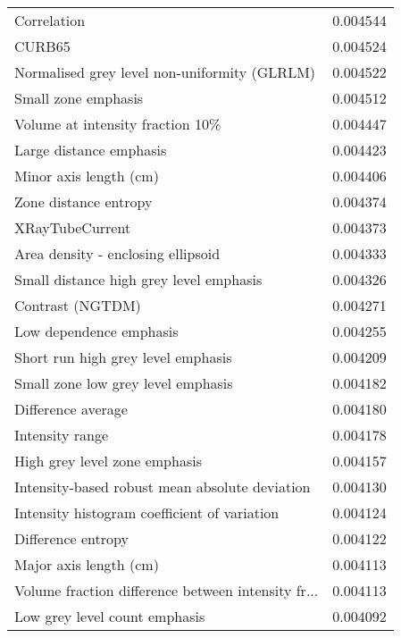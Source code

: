 \begin{longtable}{|lr|}
Correlation                                        &        0.004544 \\
CURB65                                             &        0.004524 \\
Normalised grey level non-uniformity (GLRLM)       &        0.004522 \\
Small zone emphasis                                &        0.004512 \\
Volume at intensity fraction 10\%                   &        0.004447 \\
Large distance emphasis                            &        0.004423 \\
Minor axis length (cm)                             &        0.004406 \\
Zone distance entropy                              &        0.004374 \\
XRayTubeCurrent                                    &        0.004373 \\
Area density - enclosing ellipsoid                 &        0.004333 \\
Small distance high grey level emphasis            &        0.004326 \\
Contrast (NGTDM)                                   &        0.004271 \\
Low dependence emphasis                            &        0.004255 \\
Short run high grey level emphasis                 &        0.004209 \\
Small zone low grey level emphasis                 &        0.004182 \\
Difference average                                 &        0.004180 \\
Intensity range                                    &        0.004178 \\
High grey level zone emphasis                      &        0.004157 \\
Intensity-based robust mean absolute deviation     &        0.004130 \\
Intensity histogram coefficient of variation       &        0.004124 \\
Difference entropy                                 &        0.004122 \\
Major axis length (cm)                             &        0.004113 \\
Volume fraction difference between intensity fr... &        0.004113 \\
Low grey level count emphasis                      &        0.004092 \\

\end{longtable}
